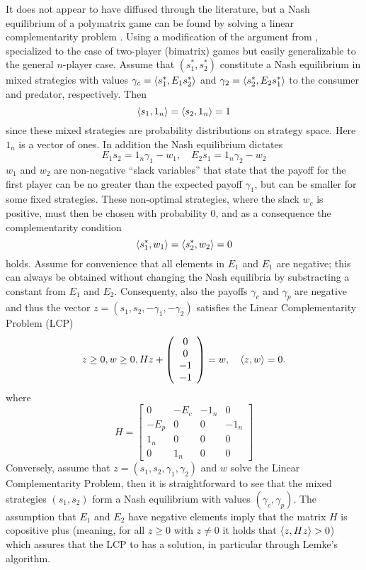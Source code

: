 It does not appear to have diffused through the literature, but a Nash equilibrium of a polymatrix game can be found by solving a linear complementarity problem \citep{miller1991copositive}. Using a modification of the argument from \citep{miller1991copositive}, specialized to the case of two-player (bimatrix) games but easily generalizable to the general $n$-player case. Assume that $(s^*_1,s^*_2)$ constitute a Nash equilibrium in mixed strategies with values $\gamma_c = \left \langle s^*_1,E_1 s^*_2 \right \rangle$ and   $\gamma_2 = \left \langle s^*_2,E_2 s^*_1 \right \rangle$ to the consumer and predator, respectively. Then
\[
  \left \langle s_1,1_n \right \rangle =
  \left \langle s_2,1_n \right \rangle =
  1
\]
since these mixed strategies are probability distributions on strategy space. Here $1_n$ is a vector of ones. In addition the Nash equilibrium dictates
\[
  E_1 s_2 = 1_n \gamma_1 - w_1
  ,\quad
  E_2 s_1 = 1_n \gamma_2  - w_2
\]
$w_1$ and $w_2$ are non-negative ``slack variables'' that state that the payoff for the first player can be no greater than the expected payoff $\gamma_1$, but can be smaller for some fixed strategies. These non-optimal strategies, where the slack $w_c$ is positive, must then be chosen with probability 0, and as a consequence the complementarity condition
\[
  \left \langle s^*_1,w_1 \right \rangle =   \left \langle s^*_2,w_2 \right \rangle = 0
\]
holds. Assume for convenience that all elements in $E_1$ and $E_1$ are negative; this can always be obtained without changing the Nash equilibria by substracting a constant from $E_1$ and $E_2$. Consequenty, also the payoffs $\gamma_c$ and $\gamma_p$ are negative and thus the vector $z = (s_1,s_2,-\gamma_1,-\gamma_2)$ satisfies the Linear Complementarity Problem (LCP)
\[
\label{eq:lcp}
  z \geq 0,
  w \geq 0 ,
  H
  z
  +
  \left(
    \begin{array}{c}
      0 \\
      0 \\
      -1 \\
      -1
    \end{array}
  \right)
  =
  w
  ,
  \quad
  \left \langle z,w \right \rangle = 0
  .
\]
where
\[
  H =
  \left[
    \begin{array}{cccc}
      0 & -E_c & -1_n & 0 \\ -E_p & 0 & 0 & -1_n \\
      1_n & 0 & 0 & 0 \\
      0 & 1_n & 0 & 0
    \end{array}
  \right]
\]
Conversely, assume that $z=(s_1,s_2,\gamma_1,\gamma_2)$ and $w$ solve the Linear Complementarity Problem, then it is straightforward to see that the mixed strategies $(s_1,s_2)$ form a Nash equilibrium with values $(\gamma_c,\gamma_p)$. The assumption that $E_1$ and $E_2$ have negative elements imply that the matrix $H$ is copositive plus (meaning, for all $z\geq0$ with $z\neq0$ it holds that $\left \langle z,Hz \right \rangle>0$) which assures that the LCP to has a solution, in particular through Lemke's algorithm.

